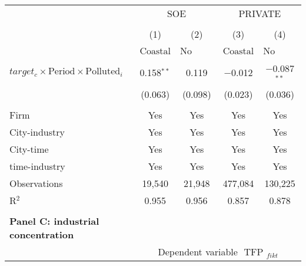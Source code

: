 \documentclass[12pt]{article}
\begin{document}
\begin{table}[!htb]
\begin{adjustbox}{width=\textwidth, totalheight=\baselineskip,keepaspectratio}
\begin{tabular}{@{\extracolsep{5pt}}lcccc}
\\[-1.8ex]
            &\multicolumn{2}{c}{SOE}&\multicolumn{2}{c}{PRIVATE}\\
\\[-1.8ex] & (1) & (2) & (3) & (4)\\
 \\[-1.8ex]&  $\text{Coastal}$  & $\text{No  Coastal}$  &  $\text{Coastal}$  & $\text{No  Coastal}$ \\
 \hline \\[-1.8ex] 
   $target_c \times \text{Period} \times \text{Polluted}_i$  & 0.158$^{**}$ & 0.119 & $-$0.012 & $-$0.087$^{**}$ \\ 
  & (0.063) & (0.098) & (0.023) & (0.036) \\ 
 \hline \\[-1.8ex] 
Firm & Yes & Yes & Yes & Yes \\ 
City-industry & Yes & Yes & Yes & Yes \\ 
City-time & Yes & Yes & Yes & Yes \\ 
time-industry & Yes & Yes & Yes & Yes \\ 
Observations & 19,540 & 21,948 & 477,084 & 130,225 \\ 
R$^{2}$ & 0.955 & 0.956 & 0.857 & 0.878 \\ 

\bottomrule 
\\ %
        \multicolumn{1}{l}{\textbf{Panel C: industrial concentration}} \\
        \toprule
         & \multicolumn{4}{c}{Dependent variable $\text { TFP }_{fikt}$} \\ 
\cline{2-5}
            

\end{tabular}
\end{adjustbox}
\end{table}
\end{document}
